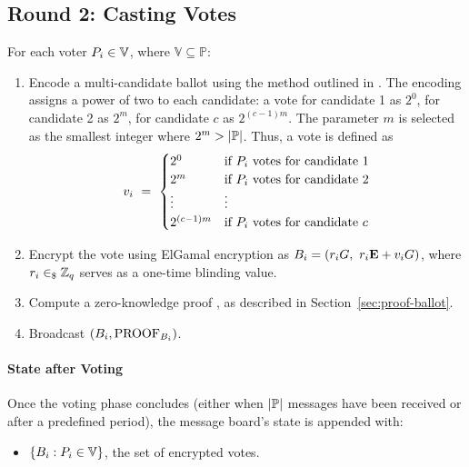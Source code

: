 \documentclass[runningheads]{llncs}
\begin{document}
\newpage
\subsection{Round 2: Casting Votes}

For each voter $P_{i} \in \mathbb{V}$, where $\mathbb{V} \subseteq  \mathbb{P}$:

\begin{enumerate}
    \item Encode a multi-candidate ballot using the method outlined in \cite{baudronPracticalMulticandidateElection2001}. The encoding assigns a power of two to each candidate: a vote for candidate 1 as $2^0$, for candidate 2 as $2^m$, for candidate $c$ as $2^{(c-1)m}$. The parameter $m$ is selected as the smallest integer where $2^m > |\mathbb{P}{}|$. Thus, a vote is defined as \[v_{i}\ =\ \begin{cases} 2^0 & \text{if } P_{i} \text{ votes for candidate 1} \\ 2^m & \text{if } P_{i} \text{ votes for candidate 2} \\ \vdots & \vdots \\ 2^{(c-1)m} & \text{if } P_{i} \text{ votes for candidate $c$}\end{cases}\]
    
    \item Encrypt the vote using ElGamal encryption as $\Ballot{i} = (\BlindingFactor{i} \G,\ \BlindingFactor{i} \EncryptionKey{} + \Vote{i} \G)$, where $r_{i} \in_{\$} \mathbb{Z}_q$ serves as a one-time blinding value.
    
    \item Compute a zero-knowledge proof , as described in Section~\ref{sec:proof-ballot}.
    
    \item Broadcast $(B_{i}, \textrm{PROOF}_{\textrm{\ensuremath{B_{i}}}})$.
\end{enumerate}

\paragraph{State after Voting}

Once the voting phase concludes (either when $|\mathbb{P}|$ messages have been received or after a predefined period), the message board's state is appended with:
\begin{itemize}
    \item $\{B_{i} : P_{i} \in \mathbb{V}\}$, the set of encrypted votes.
\end{itemize}
\end{document}
